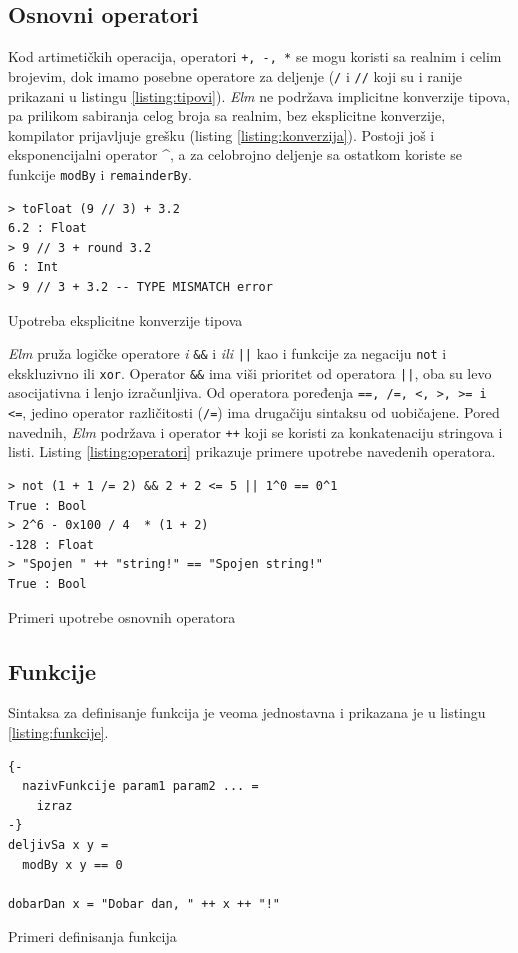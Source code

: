 \documentclass[12pt,oneside]{memoir}
\begin{document}
\subsection{Osnovni operatori}
Kod artimetičkih operacija, operatori \texttt{+, -, *} se mogu koristi sa realnim i 
celim brojevim, dok imamo posebne operatore za deljenje (\texttt{{/}} i \texttt{{//}} koji
su i ranije prikazani u listingu \ref{listing:tipovi}). \emph{Elm} ne podržava implicitne konverzije
tipova, pa prilikom sabiranja celog broja sa realnim, bez eksplicitne konverzije, kompilator
prijavljuje grešku (listing \ref{listing:konverzija}). Postoji još i eksponencijalni operator \^{},
a za celobrojno deljenje sa ostatkom koriste se funkcije \texttt{modBy} i \texttt{remainderBy}.
\begin{listing}[h]
\begin{verbatim}
> toFloat (9 // 3) + 3.2
6.2 : Float
> 9 // 3 + round 3.2
6 : Int
> 9 // 3 + 3.2 -- TYPE MISMATCH error
\end{verbatim}
\caption{Upotreba eksplicitne konverzije tipova}
\label{listing:konverzija}
\end{listing}

\emph{Elm} pruža logičke operatore \emph{i} \texttt{\&\&} i  \emph{ili} \texttt{||} kao i funkcije za negaciju 
\texttt{not} i ekskluzivno ili \texttt{xor}. Operator \texttt{\&\&} ima viši prioritet 
od operatora \texttt{||}, oba su levo asocijativna i lenjo izračunljiva. Od operatora poređenja 
\texttt{==, /=, <, >, >= i <=}, jedino operator različitosti (\texttt{/=}) ima drugačiju
sintaksu od uobičajene. Pored navednih, \emph{Elm} podržava i operator \texttt{++} koji se koristi za
konkatenaciju stringova i listi. Listing \ref{listing:operatori} prikazuje primere upotrebe 
navedenih operatora.

\begin{listing}[h]
\begin{verbatim}
> not (1 + 1 /= 2) && 2 + 2 <= 5 || 1^0 == 0^1 
True : Bool
> 2^6 - 0x100 / 4  * (1 + 2)
-128 : Float
> "Spojen " ++ "string!" == "Spojen string!"
True : Bool
\end{verbatim}
\caption{Primeri upotrebe osnovnih operatora}
\label{listing:operatori}
\end{listing}

\subsection{Funkcije}  
Sintaksa za definisanje funkcija je veoma jednostavna i prikazana je u listingu 
\ref{listing:funkcije}.
\begin{listing}[h]
\begin{verbatim}
{-
  nazivFunkcije param1 param2 ... =
    izraz  
-}
deljivSa x y =
  modBy x y == 0

dobarDan x = "Dobar dan, " ++ x ++ "!"  
\end{verbatim}
\caption{Primeri definisanja funkcija}
\label{listing:funkcije}
\end{listing}
\end{document}
